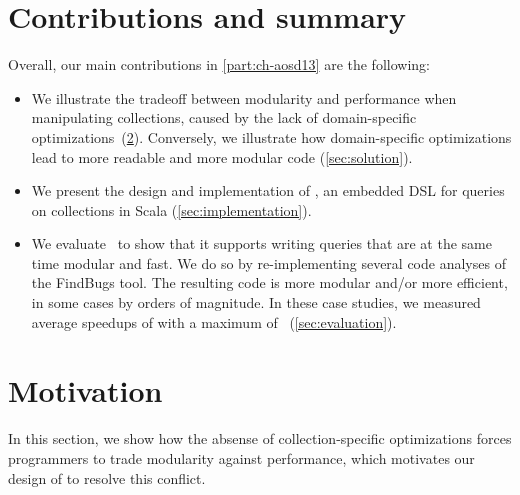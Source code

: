\section{Contributions and summary}
\label{sec:aosd13-contributions}
\label{sec:navigating-aosd13}

Overall, our main contributions in \cref{part:ch-aosd13} are the following:
\begin{itemize}
\item We illustrate the tradeoff between modularity and performance when manipulating collections, caused by the lack of domain-specific optimizations~(\cref{sec:motivation}). Conversely, we illustrate how domain-specific optimizations lead to more readable and more modular code (\cref{sec:solution}).
\item We present the design and implementation of \LoS, an embedded DSL for queries on collections in Scala (\cref{sec:implementation}).
 \item We evaluate \LoS\ to show that it supports writing queries that are at the same time modular and fast. We do so by re-implementing several code analyses of the FindBugs tool.
 The resulting code is more modular and/or more efficient, in some cases by orders of magnitude.
 In these case studies, we measured average speedups of \avgSpeedupT{} with a maximum of \maxSpeedupT{}~(\cref{sec:evaluation}).
\end{itemize}

\section{Motivation}
\label{sec:motivation}

In this section, we show how the absense of collection-specific optimizations
forces programmers to trade modularity against performance, which motivates our design of {\LoS} to resolve this conflict.

